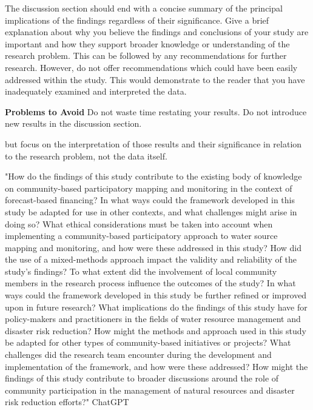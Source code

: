 The discussion section should end with a concise summary of the principal implications of the findings regardless of their significance. Give a brief explanation about why you believe the findings and conclusions of your study are important and how they support broader knowledge or understanding of the research problem. This can be followed by any recommendations for further research. However, do not offer recommendations which could have been easily addressed within the study. This would demonstrate to the reader that you have inadequately examined and interpreted the data.



\textbf{Problems to Avoid}
Do not waste time restating your results. 
Do not introduce new results in the discussion section.

but focus on the interpretation of those results and their significance in relation to the research problem, not the data itself.




"How do the findings of this study contribute to the existing body of knowledge on community-based participatory mapping and monitoring in the context of forecast-based financing?
In what ways could the framework developed in this study be adapted for use in other contexts, and what challenges might arise in doing so?
What ethical considerations must be taken into account when implementing a community-based participatory approach to water source mapping and monitoring, and how were these addressed in this study?
How did the use of a mixed-methods approach impact the validity and reliability of the study's findings?
To what extent did the involvement of local community members in the research process influence the outcomes of the study?
In what ways could the framework developed in this study be further refined or improved upon in future research?
What implications do the findings of this study have for policy-makers and practitioners in the fields of water resource management and disaster risk reduction?
How might the methods and approach used in this study be adapted for other types of community-based initiatives or projects?
What challenges did the research team encounter during the development and implementation of the framework, and how were these addressed?
How might the findings of this study contribute to broader discussions around the role of community participation in the management of natural resources and disaster risk reduction efforts?" ChatGPT









